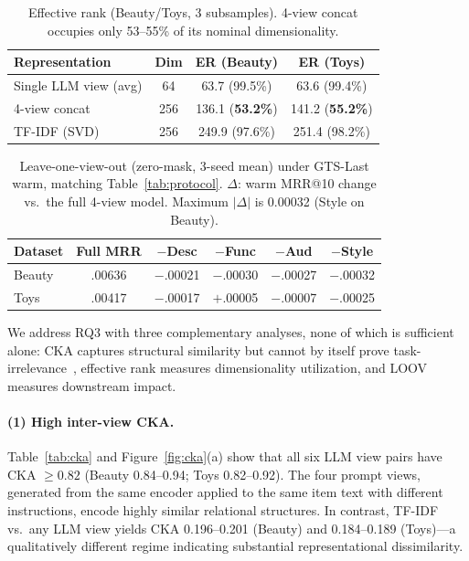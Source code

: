 \documentclass[sigconf,natbib=true,anonymous]{acmart}
\begin{document}
\begin{table}[t]
\centering
\caption{%
Effective rank (Beauty/Toys, 3 subsamples).
4-view concat occupies only 53--55\% of its nominal dimensionality.%
}
\label{tab:effrank}
\small
\begin{tabular}{@{}lccc@{}}
\toprule
Representation & Dim & ER (Beauty) & ER (Toys) \\
\midrule
Single LLM view (avg) & 64 & 63.7 (99.5\%) & 63.6 (99.4\%) \\
4-view concat & 256 & 136.1 (\textbf{53.2\%}) & 141.2 (\textbf{55.2\%}) \\
TF-IDF (SVD) & 256 & 249.9 (97.6\%) & 251.4 (98.2\%) \\
\bottomrule
\end{tabular}
\end{table}

\begin{table}[t]
\centering
\caption{%
Leave-one-view-out (zero-mask, 3-seed mean) under GTS-Last warm, matching Table~\ref{tab:protocol}.
$\Delta$: warm MRR@10 change vs.\ the full 4-view model.
Maximum $|\Delta|$ is 0.00032 (Style on Beauty).%
}
\label{tab:loov}
\small
\setlength{\tabcolsep}{3.5pt}
\begin{tabular}{@{}lccccc@{}}
\toprule
Dataset & Full MRR & $-$Desc & $-$Func & $-$Aud & $-$Style \\
\midrule
Beauty & .00636 & $-$.00021 & $-$.00030 & $-$.00027 & $-$.00032 \\
Toys   & .00417 & $-$.00017 & $+$.00005 & $-$.00007 & $-$.00025 \\
\bottomrule
\end{tabular}
\end{table}

We address RQ3 with three complementary analyses, none of which is sufficient alone: CKA captures structural similarity but cannot by itself prove task-irrelevance~\cite{kornblith2019cka}, effective rank measures dimensionality utilization, and LOOV measures downstream impact.

\paragraph{(1) High inter-view CKA.}
Table~\ref{tab:cka} and Figure~\ref{fig:cka}(a) show that all six LLM view pairs have CKA $\ge 0.82$ (Beauty 0.84--0.94; Toys 0.82--0.92).
The four prompt views, generated from the same encoder applied to the same item text with different instructions, encode highly similar relational structures.
In contrast, TF-IDF vs.\ any LLM view yields CKA 0.196--0.201 (Beauty) and 0.184--0.189 (Toys)---a qualitatively different regime indicating substantial representational dissimilarity.
\end{document}
